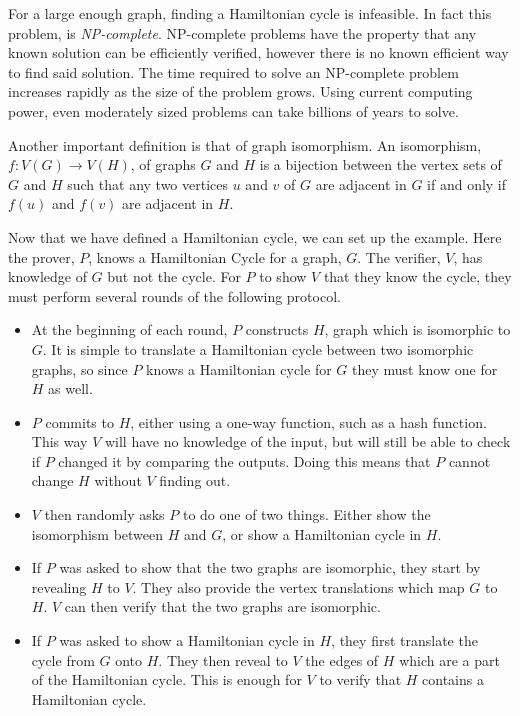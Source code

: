 \documentclass{sig-alternate}
\begin{document}
	For a large enough
	graph, finding a Hamiltonian cycle is infeasible. In fact this problem, 
	is \textit{NP-complete}. NP-complete problems have the property that
	any known solution can be efficiently verified, however there is no known
	efficient way to find said solution. The time required to solve an 
	NP-complete problem increases rapidly as the size of the problem grows.
	Using current computing power, even moderately sized problems can take 
	billions of years to solve.
	
	Another important definition is that of graph isomorphism. An
	isomorphism, $f:V(G) \rightarrow V(H)$, of graphs $G$ and $H$ is a 
	bijection between the vertex
	sets of $G$ and $H$ such that any two vertices $u$ and $v$ of $G$ are
	adjacent in $G$ if and only if $f(u)$ and $f(v)$ are adjacent in $H$.
		
	Now that we have defined a Hamiltonian cycle, we can set up the example.
	Here the prover, $P$, knows a Hamiltonian Cycle for a graph, $G$. The
	verifier, $V$, has knowledge of $G$ but not the cycle. For $P$ to show
	$V$ that they know the cycle, they must perform several rounds of the 
	following protocol.
	
	\begin{itemize}
		\item At the beginning of each round, $P$ constructs $H$, graph which
		is isomorphic to $G$. It is simple to translate a Hamiltonian cycle
		between two isomorphic graphs, so since $P$ knows a Hamiltonian cycle
		for $G$ they must know one for $H$ as well.
		
		\item $P$ commits to $H$, either using a one-way
		function, such as a hash function. This way $V$ will have no knowledge of the
		input, but will still be able to check if $P$ changed it by comparing the
		outputs. Doing this means that $P$ cannot change $H$ without $V$ finding
		out.
		
		\item $V$ then randomly asks $P$ to do one of two things. Either show
		the isomorphism between $H$ and $G$, or show a Hamiltonian cycle in $H$.
		
		\item If $P$ was asked to show that the two graphs are isomorphic, they
		start by revealing $H$ to $V$. They also provide the vertex translations
		which map $G$ to $H$. $V$ can then verify that the two graphs are isomorphic.
		
		\item If $P$ was asked to show a Hamiltonian cycle in $H$, they first 
		translate the cycle from $G$ onto $H$. They then reveal to $V$ the 
		edges of $H$ which are a part of the Hamiltonian cycle. This is
		enough for $V$ to verify that $H$ contains a Hamiltonian cycle.
	\end{itemize}
	
\end{document}
